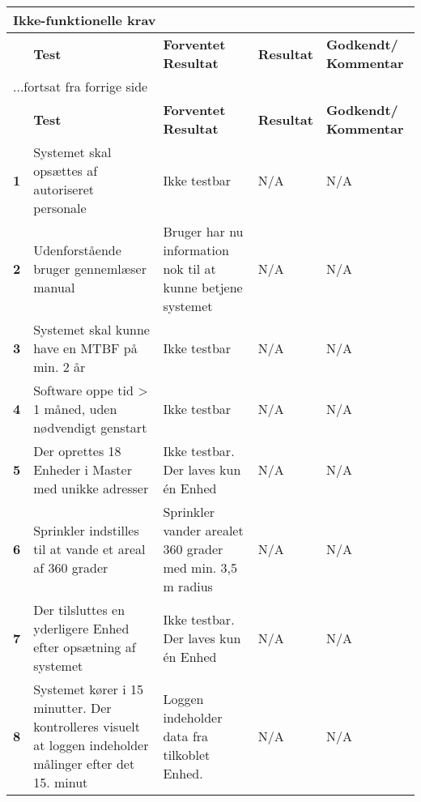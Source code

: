 \begin{center}
\begin{longtable}{|p{}|p{}|p{}|p{}|p{}|} %
\hline
\multicolumn{5}{|l|}{\textbf{Ikke-funktionelle krav}} \\ \hline
\multicolumn{1}{|c|}{} &
\textbf{Test} &
\textbf{Forventet \newline Resultat} &
\textbf{Resultat} &
\textbf{Godkendt/ \newline Kommentar} \\ \hline 
\endfirsthead

\multicolumn{5}{l}{...fortsat fra forrige side} \\ \hline 
\multicolumn{1}{|c|}{} &
\textbf{Test} &
\textbf{Forventet \newline Resultat} &
\textbf{Resultat} &
\textbf{Godkendt/ \newline Kommentar} \\ \hline 
\endhead

\textbf{1}	&Systemet skal opsættes af autoriseret personale
			&Ikke testbar
			&N/A
			&N/A \\ \hline 
			
\textbf{2}	&Udenforstående bruger gennemlæser manual
			&Bruger har nu information nok til at kunne betjene systemet
			&N/A
			&N/A \\ \hline 
			
\textbf{3}	&Systemet skal kunne have en MTBF på min. 2 år
			&Ikke testbar
			&N/A
			&N/A \\ \hline 
			
\textbf{4}	&Software oppe tid > 1 måned, uden nødvendigt genstart
			&Ikke testbar
			&N/A
			&N/A \\ \hline 
			
\textbf{5}	&Der oprettes 18 Enheder i Master med unikke adresser
			&Ikke testbar. Der laves kun én Enhed
			&N/A
			&N/A \\ \hline 
			
\textbf{6}	&Sprinkler indstilles til at vande et areal af 360 grader
			&Sprinkler vander arealet 360 grader med min. 3,5 m radius
			&N/A
			&N/A \\ \hline 
			
\textbf{7}	&Der tilsluttes en yderligere Enhed efter opsætning af systemet
			&Ikke testbar. Der laves kun én Enhed
			&N/A
			&N/A \\ \hline 
			
\textbf{8}	&Systemet kører i 15 minutter. Der kontrolleres visuelt at loggen indeholder målinger efter det 15. minut
			&Loggen indeholder data fra tilkoblet Enhed.
			&N/A
			&N/A \\ \hline 
			

\end{longtable}
\end{center}
